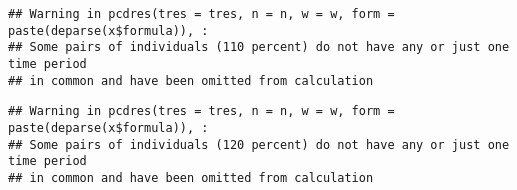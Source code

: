 \documentclass[a4paper,nobind]{templates/ociamthesis}
\newenvironment{Shaded}{\begin{snugshade}}{\end{snugshade}}
\newcommand{\FunctionTok}[1]{\textcolor[rgb]{0.00,0.00,0.00}{#1}}
\newcommand{\NormalTok}[1]{#1}
\newcommand{\OtherTok}[1]{\textcolor[rgb]{0.56,0.35,0.01}{#1}}
\newcommand{\SpecialCharTok}[1]{\textcolor[rgb]{0.00,0.00,0.00}{#1}}
\renewenvironment{Shaded}
{
  \vspace{10pt}%
  \begin{snugshade}%
}{%
  \end{snugshade}%
  \vspace{8pt}%
}
\begin{document}
\begin{Shaded}
\end{Shaded}

\begin{verbatim}
## Warning in pcdres(tres = tres, n = n, w = w, form = paste(deparse(x$formula)), :
## Some pairs of individuals (110 percent) do not have any or just one time period
## in common and have been omitted from calculation
\end{verbatim}

\begin{Shaded}
\end{Shaded}

\begin{verbatim}
## Warning in pcdres(tres = tres, n = n, w = w, form = paste(deparse(x$formula)), :
## Some pairs of individuals (120 percent) do not have any or just one time period
## in common and have been omitted from calculation
\end{verbatim}
\end{document}
